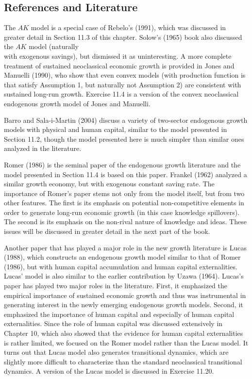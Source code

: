 \documentclass[\topdir/lecture\_notes.tex]{subfiles}
\begin{document}
\subsection{References and Literature}
The $AK$ model is a special case of Rebelo's (1991), which was discussed in greater detail in Section 11.3 of this chapter. Solow's (1965) book also discussed the $AK$ model (naturally\\
with exogenous savings), but dismissed it as uninteresting. A more complete treatment of sustained neoclassical economic growth is provided in Jones and Manuelli (1990), who show that even convex models (with production function is that satisfy Assumption 1, but naturally not Assumption 2) are consistent with sustained long-run growth. Exercise 11.4 is a version of the convex neoclassical endogenous growth model of Jones and Manuelli.

Barro and Sala-i-Martin (2004) discuss a variety of two-sector endogenous growth models with physical and human capital, similar to the model presented in Section 11.2, though the model presented here is much simpler than similar ones analyzed in the literature.

Romer (1986) is the seminal paper of the endogenous growth literature and the model presented in Section 11.4 is based on this paper. Frankel (1962) analyzed a similar growth economy, but with exogenous constant saving rate. The importance of Romer's paper stems not only from the model itself, but from two other features. The first is its emphasis on potential non-competitive elements in order to generate long-run economic growth (in this case knowledge spillovers). The second is its emphasis on the non-rival nature of knowledge and ideas. These issues will be discussed in greater detail in the next part of the book.

Another paper that has played a major role in the new growth literature is Lucas (1988), which constructs an endogenous growth model similar to that of Romer (1986), but with human capital accumulation and human capital externalities. Lucas' model is also similar to the earlier contribution by Uzawa (1964). Lucas's paper has played two major roles in the literature. First, it emphasized the empirical importance of sustained economic growth and thus was instrumental in generating interest in the newly emerging endogenous growth models. Second, it emphasized the importance of human capital and especially of human capital externalities. Since the role of human capital was discussed extensively in Chapter 10, which also showed that the evidence for human capital externalities is rather limited, we focused on the Romer model rather than the Lucas model. It turns out that Lucas model also generates transitional dynamics, which are slightly more difficult to characterize than the standard neoclassical transitional dynamics. A version of the Lucas model is discussed in Exercise 11.20.
\end{document}
